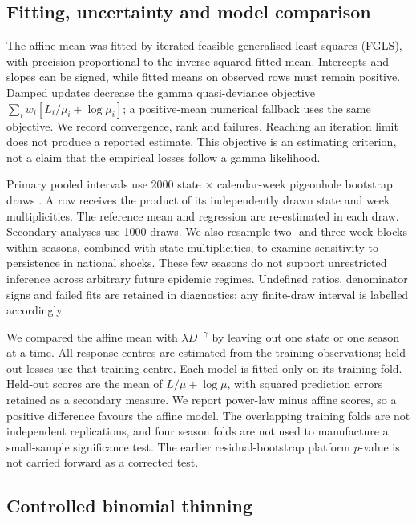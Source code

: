 \subsection{Fitting, uncertainty and model comparison}
\label{sec:meth-inference}

The affine mean was fitted by iterated feasible generalised least squares (FGLS), with precision proportional to the inverse squared fitted mean. Intercepts and slopes can be signed, while fitted means on observed rows must remain positive. Damped updates decrease the gamma quasi-deviance objective $\sum_iw_i[L_i/\mu_i+\log\mu_i]$; a positive-mean numerical fallback uses the same objective. We record convergence, rank and failures. Reaching an iteration limit does not produce a reported estimate. This objective is an estimating criterion, not a claim that the empirical losses follow a gamma likelihood.

Primary pooled intervals use 2000 state $\times$ calendar-week pigeonhole bootstrap draws \citep{owen2007pigeonhole}. A row receives the product of its independently drawn state and week multiplicities. The reference mean and regression are re-estimated in each draw. Secondary analyses use 1000 draws. We also resample two- and three-week blocks within seasons, combined with state multiplicities, to examine sensitivity to persistence in national shocks. These few seasons do not support unrestricted inference across arbitrary future epidemic regimes. Undefined ratios, denominator signs and failed fits are retained in diagnostics; any finite-draw interval is labelled accordingly.

We compared the affine mean with $\lambda D^{-\gamma}$ by leaving out one state or one season at a time. All response centres are estimated from the training observations; held-out losses use that training centre. Each model is fitted only on its training fold. Held-out scores are the mean of $L/\mu+\log\mu$, with squared prediction errors retained as a secondary measure. We report power-law minus affine scores, so a positive difference favours the affine model. The overlapping training folds are not independent replications, and four season folds are not used to manufacture a small-sample significance test. The earlier residual-bootstrap platform $p$-value is not carried forward as a corrected test.

\subsection{Controlled binomial thinning}
\label{sec:meth-thinning}

